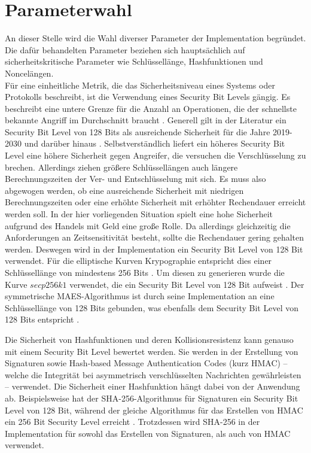 \documentclass[
	fontsize=11pt,
	headings=small,
	parskip=half,           %
	bibliography=totoc,
	numbers=noenddot,       %
	open=any,               %
]{scrreprt}
\begin{document}
\section{Parameterwahl}
An dieser Stelle wird die Wahl diverser Parameter der Implementation begründet. Die dafür behandelten Parameter beziehen sich hauptsächlich auf sicherheitskritische Parameter wie Schlüssellänge, Hashfunktionen und Noncelängen.\\
Für eine einheitliche Metrik, die das Sicherheitsniveau eines Systems oder Protokolls beschreibt, ist die Verwendung eines Security Bit Levels gängig. Es beschreibt eine untere Grenze für die Anzahl an Operationen, die der schnellste bekannte Angriff im Durchschnitt braucht \cite{ecc-hankerson2021nist}. Generell gilt in der Literatur ein Security Bit Level von 128 Bits als ausreichende Sicherheit für die Jahre 2019-2030 und darüber hinaus \cite{elaine2016recommendation}. Selbstverständlich liefert ein höheres Security Bit Level eine höhere Sicherheit gegen Angreifer, die versuchen die Verschlüsselung zu brechen. Allerdings ziehen größere Schlüssellängen auch längere Berechnungszeiten der Ver- und Entschlüsselung mit sich. Es muss also abgewogen werden, ob eine ausreichende Sicherheit mit niedrigen Berechnungszeiten oder eine erhöhte Sicherheit mit erhöhter Rechendauer erreicht werden soll. In der hier vorliegenden Situation spielt eine hohe Sicherheit aufgrund des Handels mit Geld eine große Rolle. Da allerdings gleichzeitig die Anforderungen an Zeitsensitivität besteht, sollte die Rechendauer gering gehalten werden. Deswegen wird in der Implementation ein Security Bit Level von 128 Bit verwendet. Für die elliptische Kurven Krypographie entspricht dies einer Schlüssellänge von mindestens 256 Bits \cite{elaine2016recommendation,bsi2020cryptographic}. Um diesen zu generieren wurde die Kurve $secp256k1$ verwendet, die ein Security Bit Level von 128 Bit aufweist \cite{ecc-duka2020elliptic}. Der symmetrische MAES-Algorithmus ist durch seine Implementation an eine Schlüssellänge von 128 Bits gebunden, was ebenfalls dem Security Bit Level von 128 Bits entspricht \cite{elaine2016recommendation}.

Die Sicherheit von Hashfunktionen und deren Kollisionsresistenz kann genauso mit einem Security Bit Level bewertet werden. Sie werden in der Erstellung von Signaturen sowie Hash-based Message Authentication Codes (kurz HMAC) -- welche die Integrität bei asymmetrisch verschlüsselten Nachrichten gewährleisten -- verwendet. Die Sicherheit einer Hashfunktion hängt dabei von der Anwendung ab. Beispielsweise hat der SHA-256-Algorithmus für Signaturen ein Security Bit Level von 128 Bit, während der gleiche Algorithmus für das Erstellen von HMAC ein 256 Bit Security Level erreicht \cite{elaine2016recommendation}. Trotzdessen wird SHA-256 in der Implementation für sowohl das Erstellen von Signaturen, als auch von HMAC verwendet.
\end{document}
